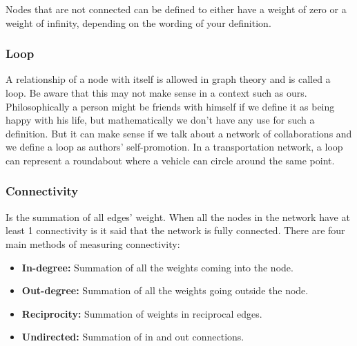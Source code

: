Nodes that are not connected can be defined to either have a weight of zero or a weight of infinity, depending on the wording of your definition.

\subsubsection{Loop}

A relationship of a node with itself is allowed in graph theory and is called a loop. Be aware that this may not make sense in a context such as ours. Philosophically a person might be friends with himself if we define it as being happy with his life, but mathematically we don't have any use for such a definition. But it can make sense if we talk about a network of collaborations and we define a loop as authors' self-promotion. In a transportation network, a loop can represent a roundabout where a vehicle can circle around the same point.

\subsubsection{Connectivity}
\label{network:Connectivity}

Is the summation of all edges' weight. When all the nodes in the network have at least 1 connectivity is it said that the network is fully connected. There are four main methods of measuring connectivity:

\begin{itemize}
    \item \textbf{In-degree:} Summation of all the weights coming into the node.
    \item \textbf{Out-degree:} Summation of all the weights going outside the node.
    \item \textbf{Reciprocity:} Summation of weights in reciprocal edges.
    \item \textbf{Undirected:} Summation of in and out connections.
\end{itemize}

